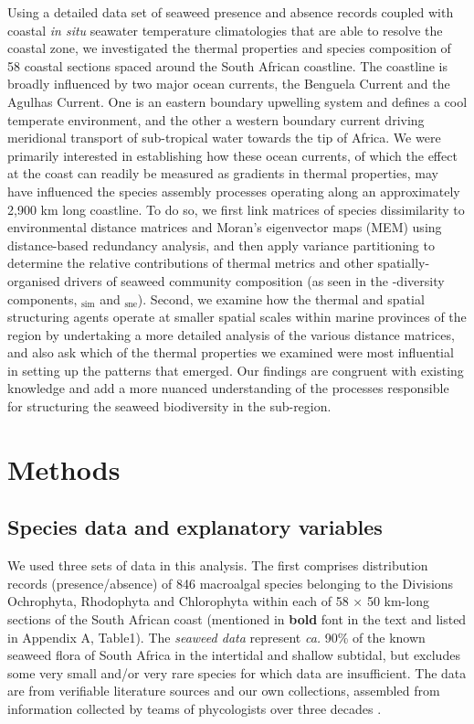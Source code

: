 \documentclass[utf8]{frontiersSCNS} %
\begin{document}
Using a detailed data set of seaweed presence and absence records coupled with coastal \emph{in situ} seawater temperature climatologies that are able to resolve the coastal zone, we investigated the thermal properties and species composition of 58 coastal sections spaced around the South African coastline. The coastline is broadly influenced by two major ocean currents, the Benguela Current and the Agulhas Current. One is an eastern boundary upwelling system and defines a cool temperate environment, and the other a western boundary current driving meridional transport of sub-tropical water towards the tip of Africa. We were primarily interested in establishing how these ocean currents, of which the effect at the coast can readily be measured as gradients in thermal properties, may have influenced the species assembly processes operating along an approximately 2,900 km long coastline. To do so, we first link matrices of species dissimilarity to environmental distance matrices and Moran's eigenvector maps (MEM) using distance-based redundancy analysis, and then apply variance partitioning \citep{PeresNeto2010} to determine the relative contributions of thermal metrics and other spatially-organised drivers of seaweed community composition (as seen in the \textbeta-diversity components, \textbeta$_{\text{sim}}$ and \textbeta$_{\text{sne}}$). Second, we examine how the thermal and spatial structuring agents operate at smaller spatial scales within marine provinces of the region by undertaking a more detailed analysis of the various distance matrices, and also ask which of the thermal properties we examined were most influential in setting up the patterns that emerged. Our findings are congruent with existing knowledge \citep[\emph{e.g.}][]{Stephenson1948,Lombard2004,Spalding2007} and add a more nuanced understanding of the processes responsible for structuring the seaweed biodiversity in the sub-region.

\section{Methods}

\subsection{Species data and explanatory variables}

We used three sets of data in this analysis. The first comprises distribution records (presence/absence) of 846 macroalgal species belonging to the Divisions Ochrophyta, Rhodophyta and Chlorophyta within each of 58 × 50 km-long sections of the South African coast (mentioned in \textbf{bold} font in the text and listed in Appendix A, Table1). The \emph{seaweed data} represent \emph{ca.} 90\% of the known seaweed flora of South Africa in the intertidal and shallow subtidal, but excludes some very small and/or very rare species for which data are insufficient. The data are from verifiable literature sources and our own collections, assembled from information collected by teams of phycologists over three decades \citep{Bolton2002,Bolton1996,Bolton1986,DeClerck2005,Stegenga1997}.
\end{document}

